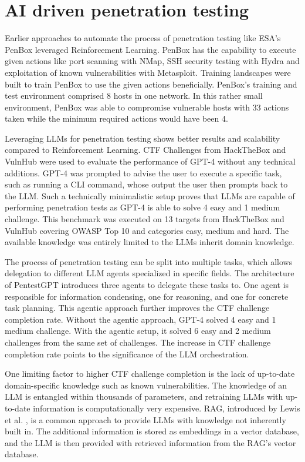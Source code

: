 \chapter{AI driven penetration testing}
\label{ch:chapter05}
Earlier approaches to automate the process of penetration testing like ESA's PenBox leveraged Reinforcement Learning. PenBox has the capability to execute given actions like port scanning with NMap, SSH security testing with Hydra and exploitation of known vulnerabilities with Metasploit. Training landscapes were built to train PenBox to use the given actions beneficially. PenBox's training and test environment comprised 8 hosts in one network. In this rather small environment, PenBox was able to compromise vulnerable hosts with 33 actions taken while the minimum required actions would have been 4. \cite{Confido_2022}

Leveraging \ac{LLM}s for penetration testing shows better results and scalability compared to Reinforcement Learning. \ac{CTF} Challenges from HackTheBox and VulnHub were used to evaluate the performance of GPT-4 without any technical additions. GPT-4 was prompted to advise the user to execute a specific task, such as running a \ac{CLI} command, whose output the user then prompts back to the \ac{LLM}. Such a technically minimalistic setup proves that \ac{LLM}s are capable of performing penetration tests as GPT-4 is able to solve 4 easy and 1 medium challenge. This benchmark was executed on 13 targets from HackTheBox and VulnHub covering OWASP Top 10 and categories easy, medium and hard. The available knowledge was entirely limited to the \ac{LLM}s inherit domain knowledge. \cite{Deng_2024}

The process of penetration testing can be split into multiple tasks, which allows delegation to different \ac{LLM} agents specialized in specific fields. The architecture of PentestGPT introduces three agents to delegate these tasks to. One agent is responsible for information condensing, one for reasoning, and one for concrete task planning. This agentic approach further improves the \ac{CTF} challenge completion rate. Without the agentic approach, GPT-4 solved 4 easy and 1 medium challenge. With the agentic setup, it solved 6 easy and 2 medium challenges from the same set of challenges. The increase in \ac{CTF} challenge completion rate points to the significance of the \ac{LLM} orchestration. \cite{Deng_2024}

One limiting factor to higher \ac{CTF} challenge completion is the lack of up-to-date domain-specific knowledge such as known vulnerabilities. The knowledge of an \ac{LLM} is entangled within thousands of parameters, and retraining \ac{LLM}s with up-to-date information is computationally very expensive. \ac{RAG}, introduced by Lewis et al. \cite{lewis_2020}, is a common approach to provide \ac{LLM}s with knowledge not inherently built in. The additional information is stored as embeddings in a vector database, and the \ac{LLM} is then provided with retrieved information from the \ac{RAG}'s vector database. \cite{lewis_2020}

